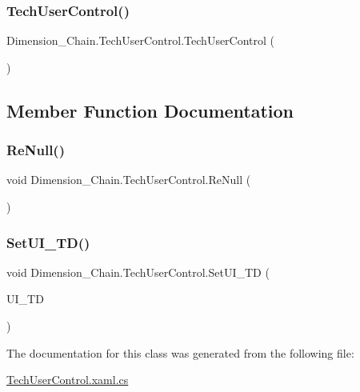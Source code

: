 \subsubsection{\texorpdfstring{Tech\+User\+Control()}{TechUserControl()}}
{\footnotesize\ttfamily Dimension\+\_\+\+Chain.\+Tech\+User\+Control.\+Tech\+User\+Control (\begin{DoxyParamCaption}{ }\end{DoxyParamCaption})}



\subsection{Member Function Documentation}
\mbox{\label{class_dimension___chain_1_1_tech_user_control_a339e3419d46f0cda9188b3335ff57f4d}} 
\subsubsection{\texorpdfstring{Re\+Null()}{ReNull()}}
{\footnotesize\ttfamily void Dimension\+\_\+\+Chain.\+Tech\+User\+Control.\+Re\+Null (\begin{DoxyParamCaption}{ }\end{DoxyParamCaption})}

\mbox{\label{class_dimension___chain_1_1_tech_user_control_ae876b7a21937a3221ab9562fa5f30465}} 
\subsubsection{\texorpdfstring{Set\+U\+I\+\_\+\+T\+D()}{SetUI\_TD()}}
{\footnotesize\ttfamily void Dimension\+\_\+\+Chain.\+Tech\+User\+Control.\+Set\+U\+I\+\_\+\+TD (\begin{DoxyParamCaption}\item[{\mbox{\hyperlink{class_dimension___chain_1_1_u_i___tech_dimension}{U\+I\+\_\+\+Tech\+Dimension}}}]{U\+I\+\_\+\+TD }\end{DoxyParamCaption})}



The documentation for this class was generated from the following file\+:\begin{DoxyCompactItemize}
\item 
\mbox{\hyperlink{_tech_user_control_8xaml_8cs}{Tech\+User\+Control.\+xaml.\+cs}}\end{DoxyCompactItemize}
